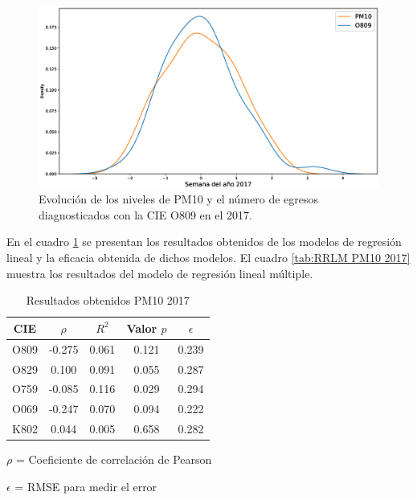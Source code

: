 \begin{figure}[h!]
\setcounter{figure}{0} %
\captionsetup{type=figure} %
\begin{center}
   \includegraphics[width=1\textwidth]{PM10_O809_2017.eps}
   \end{center}
    \caption[Series de tiempo 2017 PM10 Y O809]{Evolución de los niveles de PM10 y el número de egresos diagnosticados con la CIE O809 en el 2017.}
    \label{serie_de_tiempo_2017_PM10}
\end{figure}

En el cuadro \ref{tab:Resultados obtenidos PM10 2017} se presentan los resultados obtenidos de los modelos de regresión lineal y la eficacia obtenida de dichos modelos. El cuadro \ref{tab:RRLM PM10 2017} muestra los resultados del modelo de regresión lineal múltiple.

\begin{table}[hbt!]
\centering
\caption{Resultados obtenidos PM10 2017}
\label{tab:Resultados obtenidos PM10 2017}
\vspace{0.5cm}
\begin{threeparttable}
\begin{tabular}{|c|c|c|c|c|}
	\hline
	CIE & $\rho$ & $R^2$ & Valor $p$ & $\epsilon$\\
	\hline
	O809 & -0.275 & 0.061 & 0.121 & 0.239 \\
	\hline
	O829 & 0.100 & 0.091 & 0.055 & 0.287 \\
	\hline
	O759 & -0.085 & 0.116 & 0.029 & 0.294 \\
	\hline
	O069 & -0.247 & 0.070 & 0.094 & 0.222 \\
	\hline
	K802 & 0.044 & 0.005 & 0.658 & 0.282 \\
	\hline
\end{tabular}
\begin{tablenotes}
\footnotesize
\item{$\rho$ = Coeficiente de correlación de Pearson}
\item{$\epsilon$ = RMSE para medir el error}
\end{tablenotes}
\end{threeparttable}
\end{table}


